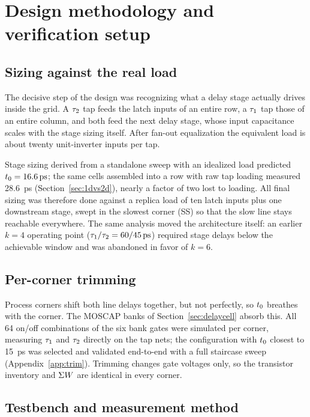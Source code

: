 \section{Design methodology and verification setup}
\label{sec:method}

\subsection{Sizing against the real load}
\label{sec:loading}

The decisive step of the design was recognizing what a delay stage actually
drives inside the grid. A $\tau_{2}$ tap feeds the latch inputs of an entire
row, a $\tau_{1}$ tap those of an entire column, and both feed the next delay
stage, whose input capacitance scales with the stage sizing itself. After
fan-out equalization the equivalent load is about twenty unit-inverter inputs
per tap.

Stage sizing derived from a standalone sweep with an idealized load predicted
$\tlsb=\SI{16.6}{\pico\second}$; the same cells assembled into a row with raw
tap loading measured \SI{28.6}{\pico\second} (Section~\ref{sec:1dvs2d}),
nearly a factor of two lost to loading. All final sizing was therefore done
against a replica load of ten latch inputs plus one downstream stage, swept
in the slowest corner (SS) so that the slow line stays reachable everywhere.
The same analysis moved the architecture itself: an earlier $k=4$ operating
point ($\ttau{1}/\ttau{2}=60/\SI{45}{\pico\second}$) required stage delays
below the achievable window and was abandoned in favor of $k=6$.

\subsection{Per-corner trimming}
\label{sec:calmethod}

Process corners shift both line delays together, but not perfectly, so $t_{0}$
breathes with the corner. The MOSCAP banks of Section~\ref{sec:delaycell}
absorb this. All 64 on/off combinations of the six bank gates were simulated
per corner, measuring $\tau_{1}$ and $\tau_{2}$ directly on the tap nets; the
configuration with $t_{0}$ closest to \SI{15}{\pico\second} was selected and
validated end-to-end with a full staircase sweep (Appendix~\ref{app:trim}).
Trimming changes gate voltages only, so the transistor inventory and $\Sigma W$
are identical in every corner.

\subsection{Testbench and measurement method}
\label{sec:testbench}

